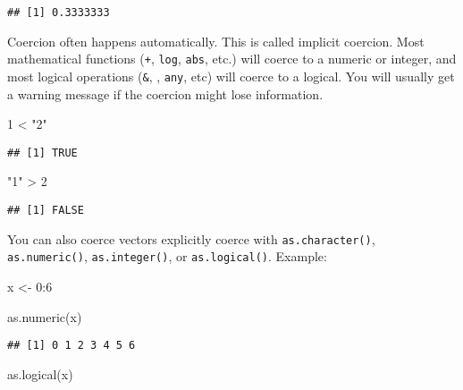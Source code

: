 \documentclass[
]{book}
\newenvironment{Shaded}{\begin{snugshade}}{\end{snugshade}}
\newcommand{\DecValTok}[1]{\textcolor[rgb]{0.00,0.00,0.81}{#1}}
\newcommand{\FunctionTok}[1]{\textcolor[rgb]{0.00,0.00,0.00}{#1}}
\newcommand{\NormalTok}[1]{#1}
\newcommand{\OtherTok}[1]{\textcolor[rgb]{0.56,0.35,0.01}{#1}}
\newcommand{\SpecialCharTok}[1]{\textcolor[rgb]{0.00,0.00,0.00}{#1}}
\newcommand{\StringTok}[1]{\textcolor[rgb]{0.31,0.60,0.02}{#1}}
\begin{document}
\begin{verbatim}
## [1] 0.3333333
\end{verbatim}

Coercion often happens automatically. This is called implicit coercion. Most mathematical functions (\texttt{+}, \texttt{log}, \texttt{abs}, etc.) will coerce to a numeric or integer, and most logical operations (\texttt{\&}, \texttt{\textbar{}}, \texttt{any}, etc) will coerce to a logical. You will usually get a warning message if the coercion might lose information.

\begin{Shaded}
\begin{Highlighting}[]
\DecValTok{1} \SpecialCharTok{\textless{}} \StringTok{"2"}
\end{Highlighting}
\end{Shaded}

\begin{verbatim}
## [1] TRUE
\end{verbatim}

\begin{Shaded}
\begin{Highlighting}[]
\StringTok{"1"} \SpecialCharTok{\textgreater{}} \DecValTok{2}
\end{Highlighting}
\end{Shaded}

\begin{verbatim}
## [1] FALSE
\end{verbatim}

You can also coerce vectors explicitly coerce with \texttt{as.character()}, \texttt{as.numeric()}, \texttt{as.integer()}, or \texttt{as.logical()}. Example:

\begin{Shaded}
\begin{Highlighting}[]
\NormalTok{x }\OtherTok{\textless{}{-}} \DecValTok{0}\SpecialCharTok{:}\DecValTok{6}

\FunctionTok{as.numeric}\NormalTok{(x)}
\end{Highlighting}
\end{Shaded}

\begin{verbatim}
## [1] 0 1 2 3 4 5 6
\end{verbatim}

\begin{Shaded}
\begin{Highlighting}[]
\FunctionTok{as.logical}\NormalTok{(x)}
\end{Highlighting}
\end{Shaded}
\end{document}
